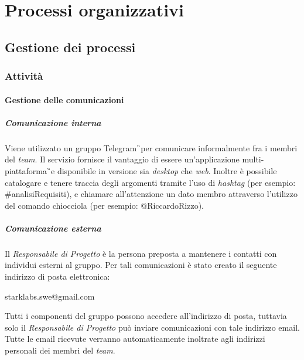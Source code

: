 \section{Processi organizzativi}
\subsection{Gestione dei processi}
\subsubsection{Attività}
\paragraph{Gestione delle comunicazioni}
\subparagraph{Comunicazione interna}
Viene utilizzato un gruppo Telegram\G\ per comunicare informalmente fra i membri del \textit{team}.
Il servizio fornisce il vantaggio di essere un'applicazione 
multi-piattaforma\G\ e disponibile in versione sia \textit{desktop} che \textit{web}. Inoltre è possibile catalogare e tenere traccia degli argomenti tramite l'uso di \textit{hashtag} (per esempio: \#analisiRequisiti), e chiamare all'attenzione un dato membro attraverso l'utilizzo del comando chiocciola (per esempio: @RiccardoRizzo).

\subparagraph{Comunicazione esterna}
Il \textit{Responsabile di Progetto} è la persona preposta a mantenere i contatti con 
individui esterni al gruppo. Per tali comunicazioni è stato creato il 
seguente indirizzo di posta elettronica:
\begin{center}
	starklabs.swe@gmail.com
\end{center}
Tutti i componenti del gruppo possono accedere all'indirizzo di posta, tuttavia solo 
il \textit{Responsabile di Progetto} può inviare comunicazioni con tale indirizzo email. 
Tutte le email ricevute verranno automaticamente inoltrate agli indirizzi personali dei membri del \textit{team}.

